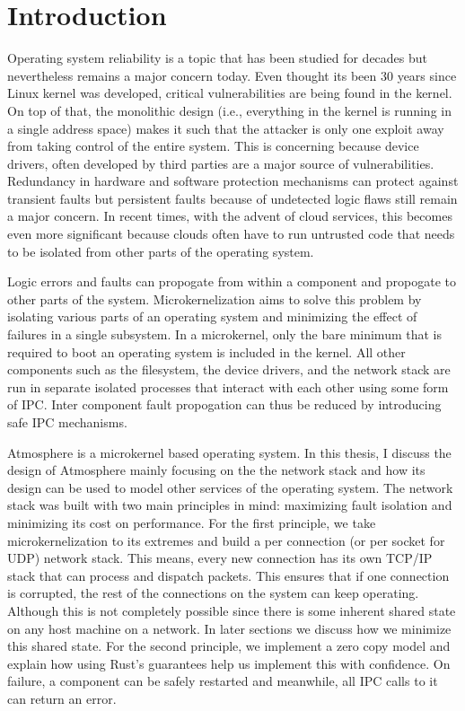 
\chapter{Introduction} %

\label{Chapter1} %


Operating system reliability is a topic that has been studied for decades but nevertheless remains a major concern today. Even thought its been 30 years since Linux kernel was developed, critical vulnerabilities are being found in the kernel. On top of that, the monolithic design (i.e., everything in the kernel is running in a single address space) makes it such that the attacker is only one exploit away from taking control of the entire system. This is concerning because device drivers, often developed by third parties are a major source of vulnerabilities. Redundancy in hardware and software protection mechanisms can protect against transient faults but persistent faults because of undetected logic flaws still remain a major concern. In recent times, with the advent of cloud services, this becomes even more significant because clouds often have to run untrusted code that needs to be isolated from other parts of the operating system.

Logic errors and faults can propogate from within a component and propogate to other parts of the system. Microkernelization aims to solve this problem by isolating various parts of an operating system and minimizing the effect of failures in a single subsystem. In a microkernel, only the bare minimum that is required to boot an operating system is included in the kernel. All other components such as the filesystem, the device drivers, and the network stack are run in separate isolated processes that interact with each other using some form of IPC. Inter component fault propogation can thus be reduced by introducing safe IPC mechanisms.

Atmosphere is a microkernel based operating system. In this thesis, I discuss the design of Atmosphere mainly focusing on the the network stack and how its design can be used to model other services of the operating system. The network stack was built with two main principles in mind: maximizing fault isolation and minimizing its cost on performance. For the first principle, we take microkernelization to its extremes and build a per connection (or per socket for UDP) network stack. This means, every new connection has its own TCP/IP stack that can process and dispatch packets. This ensures that if one connection is corrupted, the rest of the connections on the system can keep operating. Although this is not completely possible since there is some inherent shared state on any host machine on a network. In later sections we discuss how we minimize this shared state. For the second principle, we implement a zero copy model and explain how using Rust's guarantees help us implement this with confidence. On failure, a component can be safely restarted and meanwhile, all IPC calls to it can return an error. 

